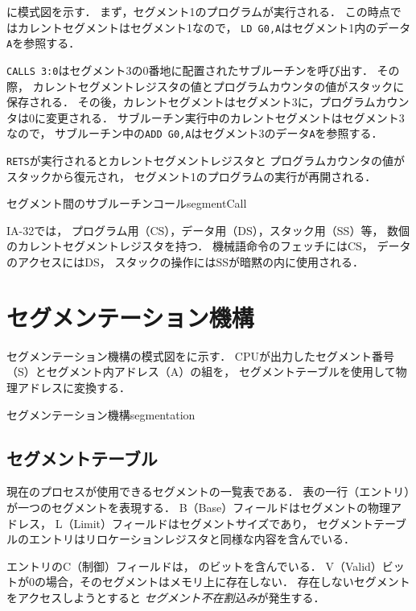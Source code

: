 に模式図を示す．
まず，セグメント1のプログラムが実行される．
この時点ではカレントセグメントはセグメント1なので，
\texttt{LD G0,A}はセグメント1内のデータ\texttt{A}を参照する．

\texttt{CALLS 3:0}はセグメント3の0番地に配置されたサブルーチンを呼び出す．
その際，
カレントセグメントレジスタの値とプログラムカウンタの値がスタックに保存される．
その後，カレントセグメントはセグメント3に，プログラムカウンタは0に変更される．
サブルーチン実行中のカレントセグメントはセグメント3なので，
サブルーチン中の\texttt{ADD G0,A}はセグメント3のデータ\texttt{A}を参照する．

\texttt{RETS}が実行されるとカレントセグメントレジスタと
プログラムカウンタの値がスタックから復元され，
セグメント1のプログラムの実行が再開される．

{セグメント間のサブルーチンコール}{segmentCall}

IA-32では，
プログラム用（CS），データ用（DS），スタック用（SS）等，
数個のカレントセグメントレジスタを持つ．
機械語命令のフェッチにはCS，
データのアクセスにはDS，
スタックの操作にはSSが暗黙の内に使用される\cite{ia32SegmentReg}．


\section{セグメンテーション機構}
セグメンテーション機構の模式図をに示す．
CPUが出力したセグメント番号（S）とセグメント内アドレス（A）の組を，
セグメントテーブルを使用して物理アドレスに変換する．

{セグメンテーション機構}{segmentation}

\subsection{セグメントテーブル}
現在のプロセスが使用できるセグメントの一覧表である．
表の一行（エントリ）が一つのセグメントを表現する．
B（Base）フィールドはセグメントの物理アドレス，
L（Limit）フィールドはセグメントサイズであり，
セグメントテーブルのエントリはリロケーションレジスタと同様な内容を含んでいる．

エントリのC（制御）フィールドは，
のビットを含んでいる．
V（Valid）ビットが0の場合，そのセグメントはメモリ上に存在しない．
存在しないセグメントをアクセスしようとすると
\emph{セグメント不在割込み}が発生する．

